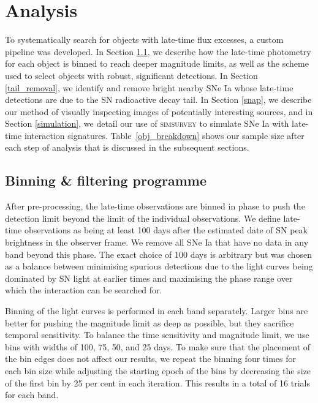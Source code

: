 \documentclass[a4paper,oneside,12pt, class=Latex/Classes/PhDthesisPSnPDF, crop=false]{standalone}
\begin{document}
\section{Analysis}\label{analysis}

To systematically search for objects with late-time flux excesses, a custom pipeline was developed. In Section \ref{pipeline}, we describe how the late-time photometry for each object is binned to reach deeper magnitude limits, as well as the scheme used to select objects with robust, significant detections. In Section \ref{tail_removal}, we identify and remove bright nearby SNe Ia whose late-time detections are due to the SN radioactive decay tail. In Section \ref{snap}, we describe our method of visually inspecting images of potentially interesting sources, and in Section \ref{simulation}, we detail our use of \textsc{simsurvey} to simulate SNe Ia with late-time interaction signatures. Table~\ref{obj_breakdown} shows our sample size after each step of analysis that is discussed in the subsequent sections. 


\subsection{Binning \& filtering programme}
\label{pipeline}

After pre-processing, the late-time observations are binned in phase to push the detection limit beyond the limit of the individual observations. We define late-time observations as being at least 100 days after the estimated date of SN peak brightness in the observer frame. We remove all SNe Ia that have no data in any band beyond this phase. The exact choice of 100 days is arbitrary but was chosen as a balance between minimising spurious detections due to the light curves being dominated by SN light at earlier times and maximising the phase range over which the interaction can be searched for. 

Binning of the light curves is performed in each band separately. Larger bins are better for pushing the magnitude limit as deep as possible, but they sacrifice temporal sensitivity. To balance the time sensitivity and magnitude limit, we use bins with widths of 100, 75, 50, and 25 days. To make sure that the placement of the bin edges does not affect our results, we repeat the binning four times for each bin size while adjusting the starting epoch of the bins by decreasing the size of the first bin by 25 per cent in each iteration. This results in a total of 16 trials for each band. 
\end{document}
